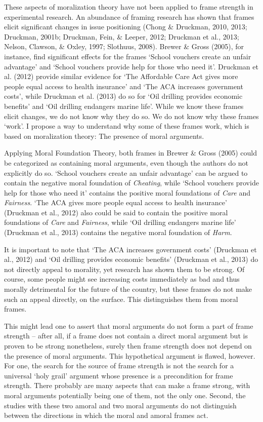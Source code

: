 \documentclass[12pt,econ]{sources/authesis}
\begin{document}
These aspects of moralization theory have not been applied to frame strength in experimental research. An abundance of framing research has shown that frames elicit significant changes in issue positioning (Chong \& Druckman, 2010, 2013; Druckman, 2001b; Druckman, Fein, \& Leeper, 2012; Druckman et al., 2013; Nelson, Clawson, \& Oxley, 1997; Slothuus, 2008). Brewer \& Gross (2005), for instance, find significant effects for the frames `School vouchers create an unfair advantage' and `School vouchers provide help for those who need it'. Druckman et al. (2012) provide similar evidence for `The Affordable Care Act gives more people equal access to health insurance' and `The ACA increases government costs', while Druckman et al. (2013) do so for `Oil drilling provides economic benefits' and `Oil drilling endangers marine life'. While we know these frames elicit changes, we do not know why they do so. We do not know why these frames `work'. I propose a way to understand why some of these frames work, which is based on moralization theory: The presence of moral arguments.

Applying Moral Foundation Theory, both frames in Brewer \& Gross (2005) could be categorized as containing moral arguments, even though the authors do not explicitly do so. `School vouchers create an unfair advantage' can be argued to contain the negative moral foundation of \textit{Cheating}, while `School vouchers provide help for those who need it' contains the positive moral foundations of \textit{Care} and \textit{Fairness}. `The ACA gives more people equal access to health insurance' (Druckman et al., 2012) also could be said to contain the positive moral foundations of \textit{Care} and \textit{Fairness}, while `Oil drilling endangers marine life' (Druckman et al., 2013) contains the negative moral foundation of \textit{Harm}.

It is important to note that `The ACA increases government costs' (Druckman et al., 2012) and `Oil drilling provides economic benefits' (Druckman et al., 2013) do not directly appeal to morality, yet research has shown them to be strong. Of course, some people might see increasing costs immediately as bad and thus morally detrimental for the future of the country, but these frames do not make such an appeal directly, on the surface. This distinguishes them from moral frames.

This might lead one to assert that moral arguments do not form a part of frame strength -- after all, if a frame does not contain a direct moral argument but is proven to be strong nonetheless, surely then frame strength does not depend on the presence of moral arguments. This hypothetical argument is flawed, however. For one, the search for the source of frame strength is not the search for a universal `holy grail' argument whose presence is a precondition for frame strength. There probably are many aspects that can make a frame strong, with moral arguments potentially being one of them, not the only one. Second, the studies with these two amoral and two moral arguments do not distinguish between the directions in which the moral and amoral frames act.
\end{document}
